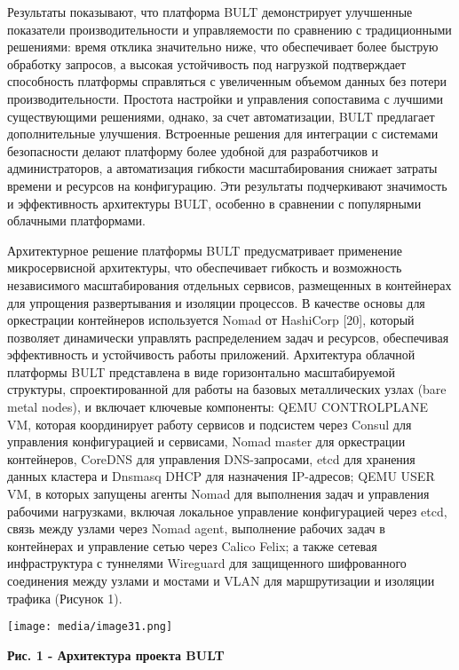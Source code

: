 \documentclass[
]{article}
\begin{document}
Результаты показывают, что платформа BULT демонстрирует улучшенные
показатели производительности и управляемости по сравнению с
традиционными решениями: время отклика значительно ниже, что
обеспечивает более быструю обработку запросов, а высокая устойчивость
под нагрузкой подтверждает способность платформы справляться с
увеличенным объемом данных без потери производительности. Простота
настройки и управления сопоставима с лучшими существующими решениями,
однако, за счет автоматизации, BULT предлагает дополнительные улучшения.
Встроенные решения для интеграции с системами безопасности делают
платформу более удобной для разработчиков и администраторов, а
автоматизация гибкости масштабирования снижает затраты времени и
ресурсов на конфигурацию. Эти результаты подчеркивают значимость и
эффективность архитектуры BULT, особенно в сравнении с популярными
облачными платформами.

Архитектурное решение платформы BULT предусматривает применение
микросервисной архитектуры, что обеспечивает гибкость и возможность
независимого масштабирования отдельных сервисов, размещенных в
контейнерах для упрощения развертывания и изоляции процессов. В качестве
основы для оркестрации контейнеров используется Nomad от HashiCorp
{[}20{]}, который позволяет динамически управлять распределением задач и
ресурсов, обеспечивая эффективность и устойчивость работы приложений.
Архитектура облачной платформы BULT представлена в виде горизонтально
масштабируемой структуры, спроектированной для работы на базовых
металлических узлах (bare metal nodes), и включает ключевые компоненты:
QEMU CONTROLPLANE VM, которая координирует работу сервисов и подсистем
через Consul для управления конфигурацией и сервисами, Nomad master для
оркестрации контейнеров, CoreDNS для управления DNS-запросами, etcd для
хранения данных кластера и Dnsmasq DHCP для назначения IP-адресов; QEMU
USER VM, в которых запущены агенты Nomad для выполнения задач и
управления рабочими нагрузками, включая локальное управление
конфигурацией через etcd, связь между узлами через Nomad agent,
выполнение рабочих задач в контейнерах и управление сетью через Calico
Felix; а также сетевая инфраструктура с туннелями Wireguard для
защищенного шифрованного соединения между узлами и мостами и VLAN для
маршрутизации и изоляции трафика (Рисунок 1).

\texttt{[image: media/image31.png]}

\textbf{Рис. 1 - Архитектура проекта BULT}
\end{document}
